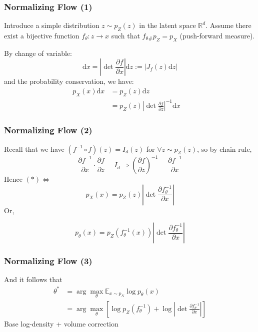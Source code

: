 \documentclass{beamer}
\begin{document}
\begin{frame}[t]
\frametitle{Normalizing Flow (1)}
Introduce a simple distribution $z\sim p_Z(z)$ in the latent space $\mathbb{R}^d$.
Assume there exist a bijective function $f_\theta: z\longrightarrow x$ such that $f_{\theta}{_\#}p_Z=p_X$ (push-forward measure).

\vspace{2em}
By change of variable:
$$
\text{d}x=\left|\det\frac{\partial f}{\partial x}\right|\text{d}z :=\left|J_f(z)\text{d}z \right|
$$
and the probability conservation, we have:
\begin{align*}
p_X(x)\text{d}x&=p_Z(z)\text{d}z\\
&=p_Z(z)\left|\det \frac{\partial f}{\partial z}\right|^{-1}\text{d}x\quad\tag{*}
\end{align*}
\end{frame}

\begin{frame}[t]
\frametitle{Normalizing Flow (2)}
Recall that we have $(f^{-1}\circ f)(z)=I_d(z)$ for $\forall z\sim p_Z(z)$, so by chain rule,
$$
\frac{\partial f^{-1}}{\partial x}\cdot\frac{\partial f}{\partial z}=I_d
\Rightarrow \left(\frac{\partial f}{\partial z}\right)^{-1}=\frac{\partial f^{-1}}{\partial x}
$$
Hence $(*)\Longleftrightarrow$
$$p_X(x)=p_Z(z)\left|\det \frac{\partial f_\theta^{-1}}{\partial x}\right|$$
Or,
\begin{tcolorbox}[colback=blue!1!white,
                  colframe=blue!75!black]
$$p_\theta(x)=p_Z(f_\theta^{-1}(x))\left|\det \frac{\partial f_\theta^{-1}}{\partial x}\right|$$
\end{tcolorbox}
\end{frame}

\begin{frame}[t]
\frametitle{Normalizing Flow (3)}
And it follows that
\begin{align*}
\theta^*&=\arg\max_\theta\mathbb{E}_{x\sim p_N}\log p_\theta(x)\\
&=\arg\max_\theta \left[\log p_Z(f_\theta^{-1})+\log \left|\det \frac{\partial f_\theta^{-1}}{\partial x}\right|\right]
\end{align*}
\vspace{2em}
Base log-density + volume correction
\end{frame}
\end{document}
